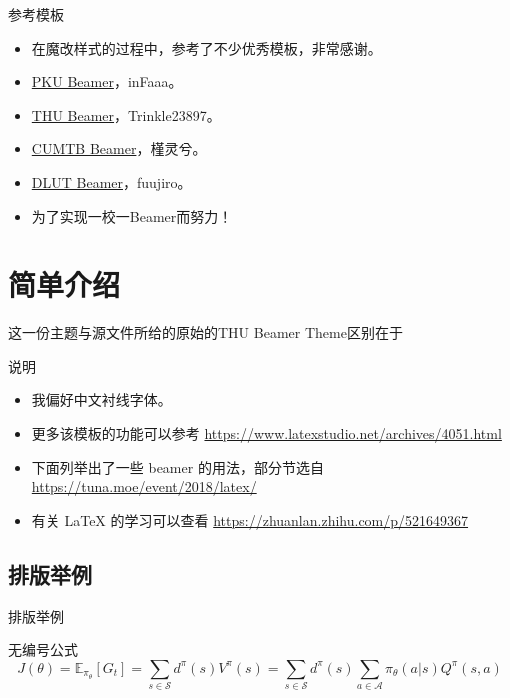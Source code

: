 \documentclass{ctexbeamer}
\newcommand\mhref[2]{{\color{linkcolor}\href{#1}{#2}}}
\newcommand\murl[1]{{\color{linkcolor} \url{#1}}}
\begin{document}
\begin{frame}{参考模板}
	\begin{itemize}
		\item 在魔改样式的过程中，参考了不少优秀模板，非常感谢。
		\item \mhref{https://github.com/inFaaa/PKU-Beamer-Theme}{PKU Beamer}，inFaaa。
		\item \mhref{https://github.com/tuna/THU-Beamer-Theme}{THU Beamer}，Trinkle23897。
		\item \mhref{https://github.com/JinLingxi/Cumtb-Beamer}{CUMTB Beamer}，槿灵兮。
		\item \mhref{https://github.com/fuujiro/DLUT-Beamer-Slide-V2}{DLUT Beamer}，fuujiro。
		\item 为了实现一校一Beamer而努力！\cite{origin}
	\end{itemize}
\end{frame}

\section{简单介绍}

\begin{frame}{这一份主题与源文件所给的原始的THU Beamer Theme区别在于}
	\begin{block}{说明}
		\begin{itemize}
			\item 我偏好中文衬线字体。
			\item 更多该模板的功能可以参考 \murl{https://www.latexstudio.net/archives/4051.html}
			\item 下面列举出了一些 beamer 的用法，部分节选自 \murl{https://tuna.moe/event/2018/latex/}
			\item 有关 \LaTeX{} 的学习可以查看 \murl{https://zhuanlan.zhihu.com/p/521649367}
		\end{itemize}
	\end{block}
\end{frame}

\subsection{排版举例}

\begin{frame}{排版举例}
	\begin{exampleblock}{无编号公式} %
		\begin{equation*}
			J(\theta) = \mathbb{E}_{\pi_\theta}[G_t] = \sum_{s\in\mathcal{S}} d^\pi (s)V^\pi(s)=\sum_{s\in\mathcal{S}} d^\pi(s)\sum_{a\in\mathcal{A}}\pi_\theta(a|s)Q^\pi(s,a)
		\end{equation*}
	\end{exampleblock}
\end{frame}
\end{document}
